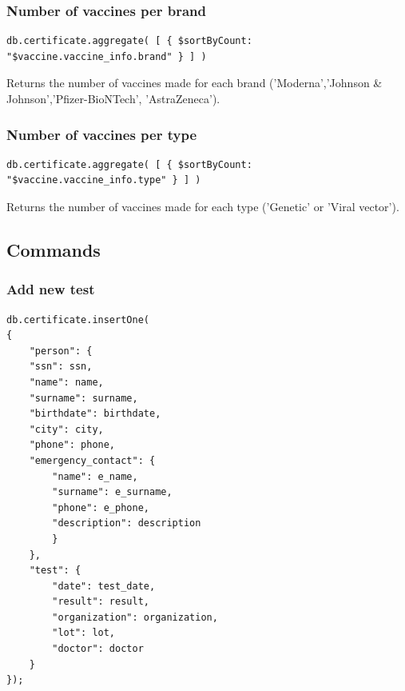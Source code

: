 \documentclass[12pt, a4paper]{article}
\begin{document}
\subsubsection{Number of vaccines per brand}
\begin{tcolorbox}[fontupper=\scriptsize]
    \begin{verbatim}
db.certificate.aggregate( [ { $sortByCount: "$vaccine.vaccine_info.brand" } ] )
    \end{verbatim}
\end{tcolorbox}

\noindent
Returns the number of vaccines made for each brand ('Moderna','Johnson \& Johnson','Pfizer-BioNTech', 'AstraZeneca').

\subsubsection{Number of vaccines per type}
\begin{tcolorbox}[fontupper=\scriptsize]
    \begin{verbatim}
db.certificate.aggregate( [ { $sortByCount: "$vaccine.vaccine_info.type" } ] )
    \end{verbatim}
\end{tcolorbox}

\noindent
Returns the number of vaccines made for each type ('Genetic' or 'Viral vector').

\subsection{Commands}

\subsubsection{Add new test} 
\begin{tcolorbox}[fontupper=\scriptsize]
    \begin{verbatim}
db.certificate.insertOne(
{ 
    "person": {
    "ssn": ssn,
    "name": name,
    "surname": surname,
    "birthdate": birthdate,
    "city": city,
    "phone": phone,
    "emergency_contact": {
        "name": e_name,
        "surname": e_surname,
        "phone": e_phone,
        "description": description
        }
    },
    "test": {
        "date": test_date,
        "result": result,
        "organization": organization,
        "lot": lot,
        "doctor": doctor
    }
});
    \end{verbatim}
\end{tcolorbox}
\end{document}
